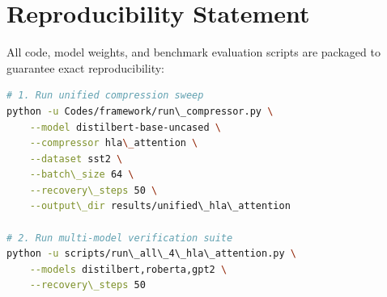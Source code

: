 \section{Reproducibility Statement}
All code, model weights, and benchmark evaluation scripts are packaged to guarantee exact reproducibility:
\begin{lstlisting}[language=bash]
# 1. Run unified compression sweep
python -u Codes/framework/run\_compressor.py \
    --model distilbert-base-uncased \
    --compressor hla\_attention \
    --dataset sst2 \
    --batch\_size 64 \
    --recovery\_steps 50 \
    --output\_dir results/unified\_hla\_attention

# 2. Run multi-model verification suite
python -u scripts/run\_all\_4\_hla\_attention.py \
    --models distilbert,roberta,gpt2 \
    --recovery\_steps 50
\end{lstlisting}
